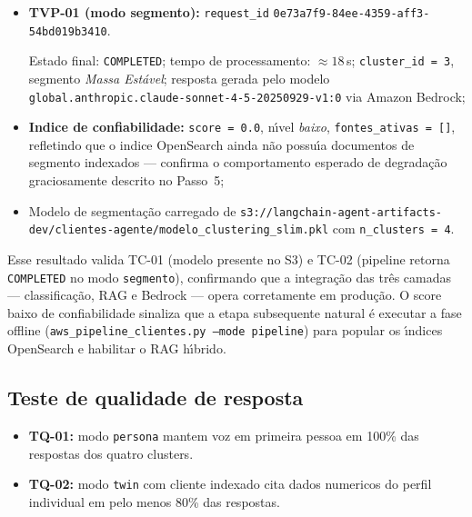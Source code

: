 \begin{itemize}[leftmargin=*]
  \item \textbf{TVP-01 (modo segmento):}
        \texttt{request\_id}
        \nolinkurl{0e73a7f9-84ee-4359-aff3-54bd019b3410}. \par
        Estado final: \texttt{COMPLETED}; tempo de processamento:
        $\approx 18$\,s; \texttt{cluster\_id = 3}, segmento
        \emph{Massa Est\'{a}vel}; resposta gerada pelo modelo
        \texttt{global.anthropic.claude-sonnet-4-5-20250929-v1:0}
        via Amazon Bedrock;
  \item \textbf{Indice de confiabilidade:} \texttt{score = 0.0},
        n\'{\i}vel \emph{baixo}, \texttt{fontes\_ativas = []}, refletindo
        que o indice OpenSearch ainda n\~ao possu\'{\i}a documentos
        de segmento indexados --- confirma o comportamento esperado de
        degrada\c{c}\~ao graciosamente descrito no Passo~5;
  \item Modelo de segmenta\c{c}\~ao carregado de
        \texttt{s3://langchain-agent-artifacts-dev/\allowbreak{}clientes-agente/\allowbreak{}modelo\_clustering\_slim.pkl}
        com \texttt{n\_clusters = 4}.
\end{itemize}

Esse resultado valida TC-01 (modelo presente no S3) e TC-02 (pipeline retorna
\texttt{COMPLETED} no modo \texttt{segmento}), confirmando que a integra\c{c}\~ao
das tr\^es camadas --- classifica\c{c}\~ao, RAG e Bedrock --- opera corretamente
em produ\c{c}\~ao. O score baixo de confiabilidade sinaliza que a etapa
subsequente natural \'{e} executar a fase offline (\texttt{aws\_pipeline\_clientes.py
--mode pipeline}) para popular os \'{\i}ndices OpenSearch e habilitar o RAG h\'{\i}brido.

\subsection{Teste de qualidade de resposta}

\begin{itemize}[leftmargin=*]
  \item \textbf{TQ-01:} modo \texttt{persona} mantem voz em primeira
        pessoa em 100\% das respostas dos quatro clusters.
  \item \textbf{TQ-02:} modo \texttt{twin} com cliente indexado cita
        dados numericos do perfil individual em pelo menos 80\% das
        respostas.
\end{itemize}

